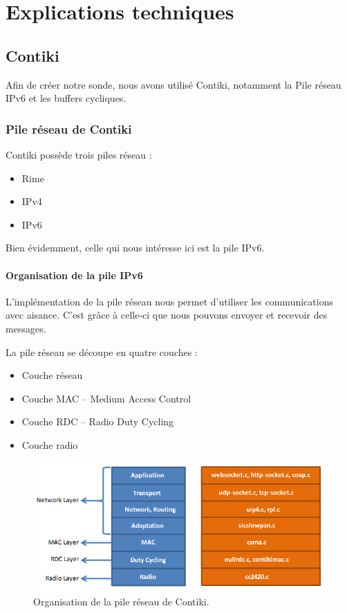 \chapter{Explications techniques}
\label{sec:technique}

\section{Contiki}

	Afin de créer notre sonde, nous avons utilisé Contiki, notamment la Pile réseau IPv6 et les buffers cycliques.
	
	\subsection{Pile réseau de Contiki}
	
		Contiki possède trois piles réseau :
		\begin{itemize}
			\item Rime
			\item IPv4
			\item IPv6
		\end{itemize}
		Bien évidemment, celle qui nous intéresse ici est la pile IPv6. 
		
		\subsubsection{Organisation de la pile IPv6}
			
			L'implémentation de la pile réseau nous permet d'utiliser les communications avec aisance. C'est grâce à celle-ci que nous pouvons envoyer et recevoir des messages.
			
			La pile réseau se découpe en quatre couches :
			\begin{itemize}
				\item Couche réseau
				\item Couche MAC -- Medium Access Control
				\item Couche RDC -- Radio Duty Cycling
				\item Couche radio
			\end{itemize}
			
			\clearpage
			
			\begin{figure}[htp]
				\centering
				\includegraphics[width=16cm]{images/Contikinetstack}
				\caption{Organisation de la pile réseau de Contiki.}
				\label{fig:contikinetstack}
			\end{figure}
			
